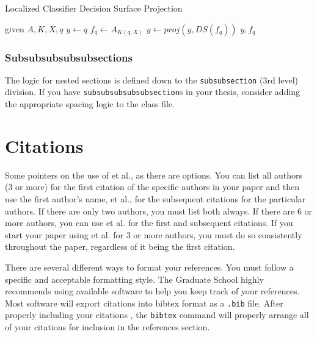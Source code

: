 \begin{algorithm}[!t] 
    \caption{Localized Classifier Decision Surface Projection}
    \label{algorithm:localsvmscms}
\begin{algorithmic}
  \STATE given $A, K, X, q$
  \STATE $y \leftarrow q$
  \REPEAT
    \STATE $f_q \leftarrow A_{K(q,X)}$
    \STATE $y \leftarrow proj(y, DS(f_q))$
  \RETURN $y, f_q$
\end{algorithmic}
\end{algorithm}

\subsubsection{Subsubsubsubsubsections}

The logic for nested sections is defined down to the \texttt{subsubsection} (3rd level) division.
 If you have \texttt{subsubsubsubsubsection}s in your thesis, consider adding the appropriate spacing logic to the class file.

\section{Citations}
 
Some pointers on the use of et al., as there are options.  You can list all authors (3 or more) for the first citation of the specific authors in your paper and then use the first author’s name, et al., for the subsequent citations for the particular authors.  If there are only two authors, you must list both always. If there are 6 or more authors, you can use et al. for the first and subsequent citations.  If you start your paper using et al. for 3 or more authors, you must do so consistently throughout the paper, regardless of it being the first citation. 

There are several different ways to format your references.  You must follow a specific and acceptable formatting style.  The Graduate School highly recommends using available software to help you keep track of your references.  Most software will export citations into bibtex format as a \texttt{.bib} file.  After properly including your citations \cite{bottou1992local}, the \texttt{bibtex} command will properly arrange all of your citations for inclusion in the references section.
